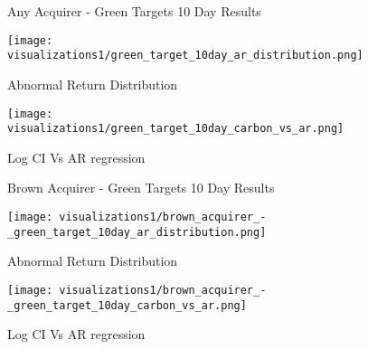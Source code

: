 \documentclass[a4paper]{article}
\begin{document}
\begin{figure}[htbp]
\caption*{Any Acquirer - Green Targets 10 Day Results}
   \begin{minipage}{0.48\textwidth}
        \centering
        \texttt{[image: visualizations1/green\_target\_10day\_ar\_distribution.png]}
        \caption{Abnormal Return Distribution}
        \label{fig:10day_GWARD}
    \end{minipage}
    \hfill
    \begin{minipage}{0.48\textwidth}
        \centering
        \texttt{[image: visualizations1/green\_target\_10day\_carbon\_vs\_ar.png]}
        \caption{Log CI Vs AR regression}
        \label{fig:10day_GCIAR}
    \end{minipage}
\end{figure}

\begin{figure}[htbp]
\caption*{Brown Acquirer - Green Targets 10 Day Results}
   \begin{minipage}{0.48\textwidth}
        \centering
        \texttt{[image: visualizations1/brown\_acquirer\_-\_green\_target\_10day\_ar\_distribution.png]}
        \caption{Abnormal Return Distribution}
        \label{fig:10day_BWARD}
    \end{minipage}
    \hfill
    \begin{minipage}{0.48\textwidth}
        \centering
        \texttt{[image: visualizations1/brown\_acquirer\_-\_green\_target\_10day\_carbon\_vs\_ar.png]}
        \caption{Log CI Vs AR regression}
        \label{fig:10day_BCIAR}
    \end{minipage}
\end{figure}
\end{document}
